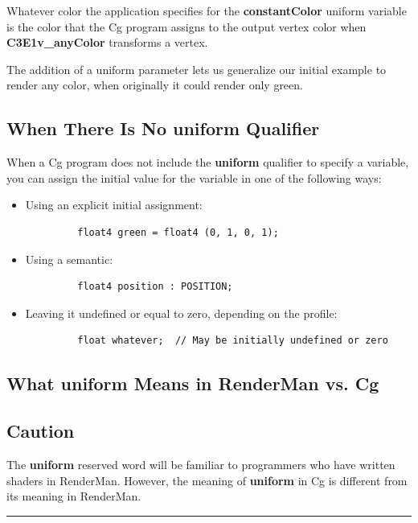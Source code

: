 \documentclass{book}
\begin{document}
Whatever color the application specifies for the \textbf{constantColor} uniform variable is the color that the Cg program assigns to the output vertex color when \textbf{C3E1v_anyColor} transforms a vertex.

The addition of a uniform parameter lets us generalize our initial example to render any color, when originally it could render only green.

\subsection*{When There Is No uniform Qualifier}

When a Cg program does not include the \textbf{uniform} qualifier to specify a variable, you can assign the initial value for the variable in one of the following ways:

\FloatBarrier
\begin{itemize}
\item Using an explicit initial assignment:
\FloatBarrier
\begin{lstlisting}
         float4 green = float4 (0, 1, 0, 1);
\end{lstlisting}
\FloatBarrier

\item Using a semantic:
\FloatBarrier
\begin{lstlisting}
         float4 position : POSITION;
\end{lstlisting}
\FloatBarrier

\item Leaving it undefined or equal to zero, depending on the profile:
\FloatBarrier
\begin{lstlisting}
         float whatever;  // May be initially undefined or zero
\end{lstlisting}
\FloatBarrier
\end{itemize}
\FloatBarrier

\subsection*{What \textbf{uniform} Means in RenderMan vs. Cg}

\subsection*{Caution}

The \textbf{uniform} reserved word will be familiar to programmers who have written shaders in RenderMan. However, the meaning of \textbf{uniform} in Cg is different from its meaning in RenderMan.
\hrule
\end{document}
